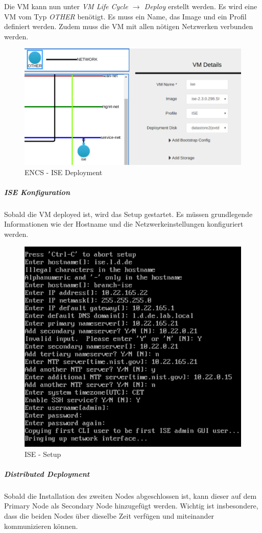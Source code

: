Die VM kann nun unter \textit{VM Life Cycle $\rightarrow$ Deploy} erstellt werden. Es wird eine VM vom Typ \textit{OTHER} benötigt. Es muss ein Name, das Image und ein Profil definiert werden. Zudem muss die VM mit allen nötigen Netzwerken verbunden werden.

\begin{figure}[H]
	\centering
	\includegraphics[width=0.8\linewidth]{img/Absicherung/ENCS-ISE-Deployment.png}
	\caption{ENCS - ISE Deployment}
	\label{fig:ENCS - ISE Deployment}
\end{figure}

\subparagraph{ISE Konfiguration}

Sobald die VM deployed ist, wird das Setup gestartet. Es müssen grundlegende Informationen wie der Hostname und die Netzwerkeinstellungen konfiguriert werden.  

\begin{figure}[H]
	\centering
	\includegraphics[width=0.6\linewidth]{img/Absicherung/ISE-Setup.png}
	\caption{ISE - Setup}
	\label{fig:ISE-Setup}
\end{figure}

\subparagraph{Distributed Deployment}

Sobald die Installation des zweiten Nodes abgeschlossen ist, kann dieser auf dem Primary Node als Secondary Node hinzugefügt werden.
Wichtig ist insbesondere, dass die beiden Nodes über dieselbe Zeit verfügen und miteinander kommunizieren können.

